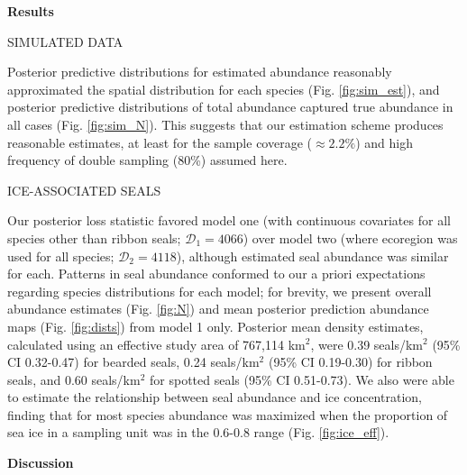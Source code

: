 \documentclass[12pt,fleqn]{article}
\begin{document}
\begin{flushleft}
\vspace{.3in}
{\bf Results} \\
\vspace{.15in}

\vspace{.15in}
SIMULATED DATA \\
\vspace{.15in}

Posterior predictive distributions for estimated abundance reasonably approximated the spatial distribution for each species (Fig. \ref{fig:sim_est}), and posterior predictive distributions of total abundance captured true abundance in all cases (Fig. \ref{fig:sim_N}).  This suggests that our estimation scheme produces reasonable estimates, at least for the sample coverage ($\approx 2.2\%$) and high frequency of double sampling (80\%) assumed here.

\vspace{.15in}
ICE-ASSOCIATED SEALS\\
\vspace{.15in}

Our posterior loss statistic favored model one (with continuous covariates for all species other than ribbon seals; $\mathcal{D}_1=4066$) over model two (where ecoregion was used for all species; $\mathcal{D}_2=4118$), although estimated
seal abundance was similar for each. Patterns in seal abundance conformed to our a priori expectations regarding species distributions for each model; for brevity, we present overall abundance estimates (Fig. \ref{fig:N}) and mean posterior prediction abundance maps (Fig. \ref{fig:dists}) from model 1 only. Posterior mean density estimates, calculated using an effective study area of 767,114 km$^2$, were 0.39 seals/km$^2$ (95\% CI 0.32-0.47) for bearded seals, 0.24 seals/km$^2$ (95\% CI 0.19-0.30) for ribbon seals, and 0.60 seals/km$^2$ for spotted seals (95\% CI 0.51-0.73).  We also were able to estimate the relationship between seal abundance and ice concentration, finding that for most species abundance was maximized when the proportion of sea ice in a sampling unit was in the 0.6-0.8 range (Fig. \ref{fig:ice_eff}).


\vspace{.3in}
{\bf Discussion} \\
\vspace{.15in}


\end{flushleft}
\end{document}
